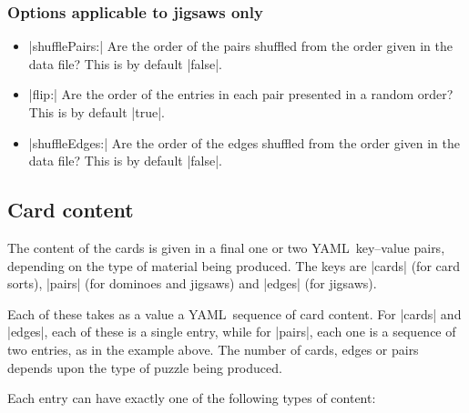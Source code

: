 \documentclass{article}
\def\YAML{{\small YAML}}
\begin{document}
\subsubsection*{Options applicable to jigsaws only}

\begin{itemize}
\item |shufflePairs:| Are the order of the pairs shuffled from
  the order given in the data file?  This is by default |false|.
\item |flip:| Are the order of the entries in each pair presented
  in a random order?  This is by default |true|.
\item |shuffleEdges:| Are the order of the edges shuffled from
  the order given in the data file?  This is by default |false|.
\end{itemize}

\subsection{Card content}

The content of the cards is given in a final one or two \YAML\
key--value pairs, depending on the type of material being produced.
The keys are |cards| (for card sorts), |pairs| (for dominoes and
jigsaws) and |edges| (for jigsaws).

Each of these takes as a value a \YAML\ sequence of card content.  For
|cards| and |edges|, each of these is a single entry, while for
|pairs|, each one is a sequence of two entries, as in the example
above.  The number of cards, edges or pairs depends upon the type of
puzzle being produced.

Each entry can have exactly one of the following types of content:
\end{document}
